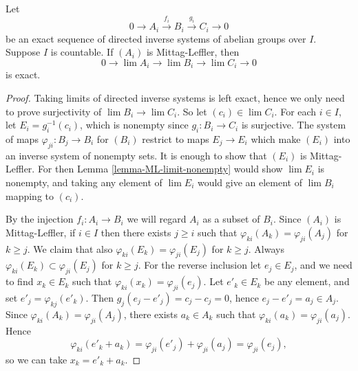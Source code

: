 \begin{lemma}
\label{lemma-ML-exact-sequence}
Let
$$
0 \to A_i \xrightarrow{f_i} B_i \xrightarrow{g_i} C_i \to 0
$$
be an exact sequence of directed inverse systems of abelian groups over $I$.
Suppose $I$ is countable.  If $(A_i)$ is Mittag-Leffler, then
$$
0 \to \lim A_i \to \lim B_i \to \lim C_i\to 0
$$
is exact.
\end{lemma}

\begin{proof}
Taking limits of directed inverse systems is left exact, hence we only need to
prove surjectivity of $\lim B_i \to \lim C_i$.  So let $(c_i) \in \lim
C_i$.  For each $i \in I$, let $E_i = g_i^{-1}(c_i)$, which is nonempty since
$g_i: B_i \to C_i$ is surjective. The system of maps $\varphi_{ji}: B_j
\to B_i$ for $(B_i)$ restrict to maps $E_j \to E_i$ which
make $(E_i)$ into an inverse system of nonempty sets.  It is enough to show
that $(E_i)$ is Mittag-Leffler. For then Lemma \ref{lemma-ML-limit-nonempty}
would show $\lim E_i$ is nonempty, and taking any element of $\lim E_i$ would
give an element of $\lim B_i$ mapping to $(c_i)$.

\medskip\noindent
By the injection $f_i: A_i \to B_i$ we will regard $A_i$ as a subset of
$B_i$.  Since $(A_i)$ is Mittag-Leffler, if $i \in I$ then there exists $j \geq
i$ such that $\varphi_{ki}(A_k) = \varphi_{ji}(A_j)$ for $k \geq j$.  We claim
that also $\varphi_{ki}(E_k) = \varphi_{ji}(E_j)$ for $k \geq j$.  Always
$\varphi_{ki}(E_k) \subset \varphi_{ji}(E_j)$ for $k \geq j$.  For the reverse
inclusion let $e_j \in E_j$, and we need to find $x_k \in E_k$ such that
$\varphi_{ki}(x_k) = \varphi_{ji}(e_j)$.  Let $e'_k \in E_k$ be any element,
and set $e'_j = \varphi_{kj}(e'_k)$.  Then $g_j(e_j - e'_j) = c_j - c_j = 0$,
hence $e_j - e'_j = a_j \in A_j$.  Since $\varphi_{ki}(A_k) =
\varphi_{ji}(A_j)$, there exists $a_k \in A_k$ such that $\varphi_{ki}(a_k) =
\varphi_{ji}(a_j)$.  Hence
$$
\varphi_{ki}(e'_k + a_k) = \varphi_{ji}(e'_j) + \varphi_{ji}(a_j) =
\varphi_{ji}(e_j),
$$
so we can take $x_k = e'_k + a_k$.
\end{proof}
